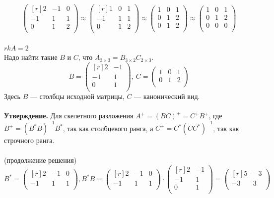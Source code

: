 \documentclass[12pt]{article}
\theoremstyle{definition}
\numberwithin{equation}{section}
\begin{document}
\[\begin{pmatrix}[r]
2 & -1 & 0 \\         
-1 & 1 & 1 \\
0 & 1 & 2 \\
\end{pmatrix} \approx \begin{pmatrix}[r]
1 & 0 & 1 \\         
-1 & 1 & 1\\
0 & 1 & 2\\
\end{pmatrix} \approx \begin{pmatrix}
1 & 0 & 1 \\         
0 & 1 & 2 \\
0 & 1 & 2 \\
\end{pmatrix} \approx \begin{pmatrix}
1 & 0 & 1 \\         
0 & 1 & 2 \\
0 & 0 & 0 \\
\end{pmatrix}\]\\
$rkA=2$\\
Надо найти такие $B$ и $C$, что $A_{3 \times 3}=B_{3 \times 2}C_{2 \times 3}$.
\[B = \begin{pmatrix}[r]
2 & -1 \\         
-1 & 1 \\
0 & 1 \\
\end{pmatrix}, ~ C = \begin{pmatrix}
1 & 0 & 1 \\         
0 & 1 & 2 \\
\end{pmatrix}\]
Здесь $B$ --- столбцы исходной матрицы, $C$ --- канонический вид.\\ \\
\textbf{Утверждение.}
Для скелетного разложения $A^+=(BC)^+=C^+B^+$, где 
$B^+=(B^*B)^{-1}B^*$, так как столбцевого ранга, а
$C^+=C^*(CC^*)^{-1}$, так как строчного ранга.\\ \\
(продолжение решения)
\[B^* = \begin{pmatrix}[r]
2 & -1 & 0 \\         
-1 & 1 & 1 \\
\end{pmatrix}, B^*B = \begin{pmatrix}[r]
2 & -1 & 0 \\         
-1 & 1 & 1 \\
\end{pmatrix} \cdot \begin{pmatrix}[r]
2 & -1 \\         
-1 & 1 \\
0 & 1 \\
\end{pmatrix} = \begin{pmatrix}[r]
5 & -3 \\         
-3 & 3 \\
\end{pmatrix}\]\\
\end{document}
